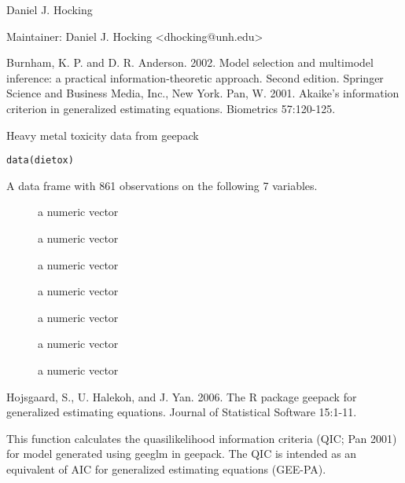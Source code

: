\documentclass[a4paper]{book}
\begin{document}
%
\begin{Author}\relax
Daniel J. Hocking

Maintainer: Daniel J. Hocking <dhocking@unh.edu>
\end{Author}
%
\begin{References}\relax
Burnham, K. P. and D. R. Anderson. 2002. Model selection and multimodel inference: a practical information-theoretic approach. Second edition. Springer Science and Business Media, Inc., New York.
Pan, W. 2001. Akaike's information criterion in generalized estimating equations. Biometrics 57:120-125.
\end{References}
%
\begin{Description}\relax
Heavy metal toxicity data from geepack
\end{Description}
%
\begin{Usage}
\begin{verbatim}
data(dietox)
\end{verbatim}
\end{Usage}
%
\begin{Format}
A data frame with 861 observations on the following 7 variables.
\begin{description}

\item[] a numeric vector
\item[] a numeric vector
\item[] a numeric vector
\item[] a numeric vector
\item[] a numeric vector
\item[] a numeric vector
\item[] a numeric vector

\end{description}

\end{Format}
%
\begin{References}\relax
Hojsgaard, S., U. Halekoh, and J. Yan. 2006. The R package geepack for generalized estimating equations. Journal of Statistical Software 15:1-11.
\end{References}
%
\begin{Description}\relax
This function calculates the quasilikelihood information criteria (QIC; Pan 2001) for model generated using geeglm in geepack. The QIC is intended as an equivalent of AIC for generalized estimating equations (GEE-PA).
\end{Description}
\end{document}
